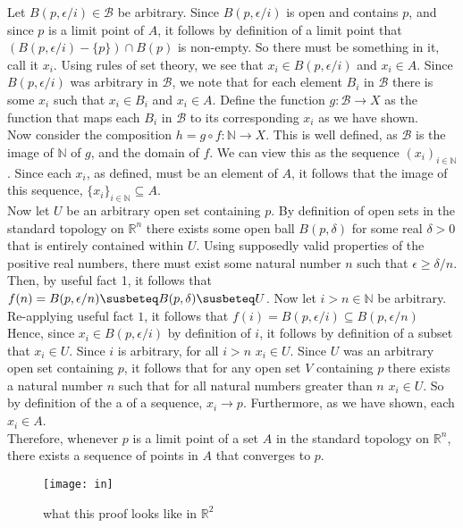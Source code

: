 \documentclass{article}
\newcommand{\N}{\mathbb{N}}
\newcommand{\R}{\mathbb{R}}
\begin{document}
Let $B(p,\epsilon/i)\in \mathcal{B}$ be arbitrary. Since $B(p,\epsilon/i)$ is open and contains $p$, and since $p$ is a limit point of $A$, it follows by definition of a limit point that $(B(p,\epsilon/i)-\{p\})\cap B(p)$ is non-empty. So there must be something in it, call it $x_i$. Using rules of set theory, we see that $x_i\in B(p,\epsilon/i)$ and $x_i\in A$. Since $B(p,\epsilon/i)$ was arbitrary in $\mathcal{B}$, we note that for each element $B_i$ in $\mathcal{B}$ there is some $x_i$ such that $x_i\in B_i$ and $x_i\in A$. Define the function $g : \mathcal{B}\rightarrow X$ as the function that maps each $B_i$ in $\mathcal{B}$ to its corresponding $x_i$ as we have shown.\\

Now consider the composition $h = g\circ f: \N \rightarrow X$. This is well defined, as $\mathcal B$ is the image of $\N$ of $g$, and the domain of $f$. We can view this as the sequence $(x_i)_{i\in \N}$. Since each $x_i$, as defined, must be an element of $A$, it follows that the image of this sequence, $\{x_i\}_{i\in \N}\subseteq A$. \\

Now let $U$ be an arbitrary open set containing $p$. By definition of open sets in the standard topology on $\R^n$ there exists some open ball $B(p,\delta)$ for some real $\delta > 0$ that is entirely contained within $U$. Using supposedly valid properties of the positive real numbers, there must exist some natural number $n$ such that $\epsilon \ge \delta/n$. Then, by useful fact 1, it follows that $f(n) = B(p,\epsilon/n) \susbeteq B(p,\delta ) \susbeteq U$. Now let $i> n\in \N$ be arbitrary. Re-applying useful fact $1$, it follows that $f(i) = B(p,\epsilon/i) \subseteq B(p,\epsilon/n) $ Hence, since $x_i\in B(p,\epsilon/i)$ by definition of $i$, it follows by definition of a subset that $x_i\in U$.  Since $i$ is arbitrary, for all $i> n$ $x_i\in U$. Since $U$ was an arbitrary open set containing $p$, it follows that for any open set $V$ containing $p$ there exists a natural number $n$ such that for all natural numbers greater than $n$ $x_i \in U$. So by definition of the a of a sequence, $x_i \rightarrow p$. Furthermore, as we have shown, each $x_i\in A$.\\

Therefore, whenever $p$ is a limit point of a set $A$ in the standard topology on $\R^n$, there exists a sequence of points in $A$ that converges to $p$.
\\

\begin{figure}[htbp]
\centerline{\texttt{[image: in]}}
\caption{what this proof looks like in $\R^2$}
\label{fig}
\end{figure}
\end{document}
